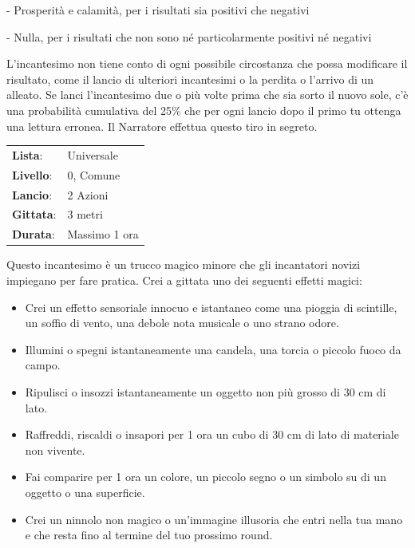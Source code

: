 \begin{multicols}{2}
- Prosperità e calamità, per i risultati sia positivi che negativi

- Nulla, per i risultati che non sono né particolarmente positivi né negativi

L'incantesimo non tiene conto di ogni possibile circostanza che possa modificare il risultato, come il lancio di ulteriori incantesimi o la perdita o l'arrivo di un alleato. Se lanci l'incantesimo due o più volte prima che sia sorto il nuovo sole, c'è una probabilità cumulativa del 25\% che per ogni lancio dopo il primo tu ottenga una lettura erronea. Il Narratore effettua questo tiro in segreto.

\noindent\begin{tabularx}{\linewidth}{p{1.3cm}X}
	\rowcolor{gray!20}\textbf{Lista}: & Universale \\
	\textbf{Livello}: & 0, Comune \\
	\rowcolor{gray!20}\textbf{Lancio}: & 2 Azioni \\
	\textbf{Gittata}: & 3 metri \\
	\rowcolor{gray!20}\textbf{Durata}: & Massimo 1 ora \\
\end{tabularx}\smallskip

Questo incantesimo è un trucco magico minore che gli incantatori novizi impiegano per fare pratica. Crei a gittata uno dei seguenti effetti magici:

\begin{itemize}[leftmargin=*] \setlength{\itemsep}{0pt}
	\item Crei un effetto sensoriale innocuo e istantaneo come una pioggia di scintille, un soffio di vento, una debole nota musicale o uno strano odore.
	\item Illumini o spegni istantaneamente una candela, una torcia o piccolo fuoco da campo.
	\item Ripulisci o insozzi istantaneamente un oggetto non più grosso di 30 cm di lato.
	\item Raffreddi, riscaldi o insapori per 1 ora un cubo di 30 cm di lato di materiale non vivente.
	\item Fai comparire per 1 ora un colore, un piccolo segno o un simbolo su di un oggetto o una superficie.
	\item Crei un ninnolo non magico o un'immagine illusoria che entri nella tua mano e che resta fino al termine del tuo prossimo round.
\end{itemize}


\end{multicols}
